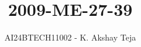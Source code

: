 \documentclass[journal,9pt,onecolumn]{IEEEtran}
\begin{document}

\vspace{3cm}
\title{2009-ME-27-39}
\author{AI24BTECH11002 - K. Akshay Teja}
\maketitle
 \bigskip
{\let\newpage\relax\maketitle}

\renewcommand{\thefigure}{\theenumi}
\renewcommand{\thetable}{\theenumi}
\setlength{\intextsep}{10pt} %

\renewcommand{\thetable}{\theenumi}
\end{document}
